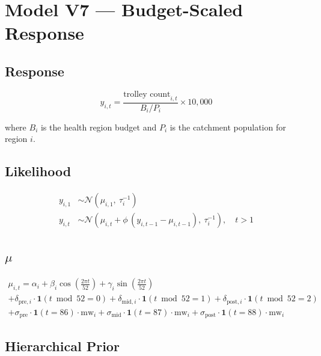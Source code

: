 \documentclass{article}
\begin{document}
\section*{Model V7 --- Budget-Scaled Response}

\subsection*{Response}

\begin{equation}
  y_{i,t} = \frac{\text{trolley count}_{i,t}}{B_i / P_i} \times 10{,}000
\end{equation}

where $B_i$ is the health region budget and $P_i$ is the catchment population for region $i$.

\subsection*{Likelihood}

\begin{align}
  y_{i,1} &\sim \mathcal{N}(\mu_{i,1},\ \tau_i^{-1}) \\[6pt]
  y_{i,t} &\sim \mathcal{N}\left(\mu_{i,t} + \phi\,(y_{i,t-1} - \mu_{i,t-1}),\ \tau_i^{-1}\right), \quad t > 1
\end{align}

\subsection*{$\mu$}

\begin{multline}
  \mu_{i,t} = \alpha_i
    + \beta_i \cos\left(\tfrac{2\pi t}{52}\right)
    + \gamma_i \sin\left(\tfrac{2\pi t}{52}\right) \\
    + \delta_{\text{pre},i} \cdot \mathbf{1}(t \bmod 52 = 0)
    + \delta_{\text{mid},i} \cdot \mathbf{1}(t \bmod 52 = 1)
    + \delta_{\text{post},i} \cdot \mathbf{1}(t \bmod 52 = 2) \\
    + \sigma_{\text{pre}} \cdot \mathbf{1}(t = 86) \cdot \mathrm{mw}_i
    + \sigma_{\text{mid}} \cdot \mathbf{1}(t = 87) \cdot \mathrm{mw}_i
    + \sigma_{\text{post}} \cdot \mathbf{1}(t = 88) \cdot \mathrm{mw}_i
\end{multline}

\subsection*{Hierarchical Prior}
\end{document}

